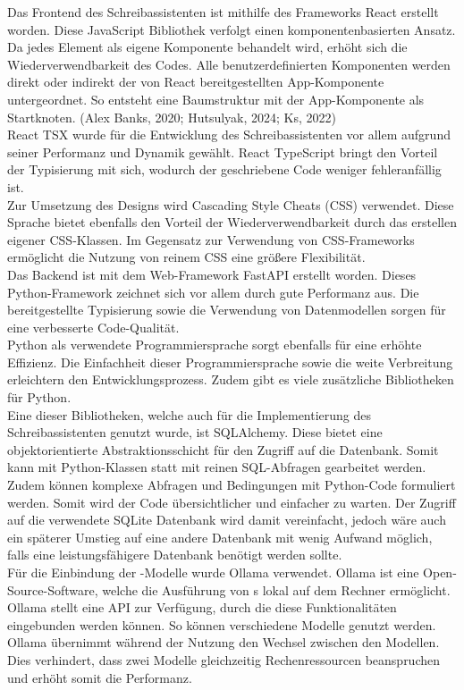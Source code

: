 \documentclass[../main.tex]{subfiles}
\begin{document}
Das Frontend des Schreibassistenten ist mithilfe des Frameworks React erstellt worden. Diese JavaScript Bibliothek verfolgt einen komponentenbasierten Ansatz. Da jedes Element als 
eigene Komponente behandelt wird, erhöht sich die Wiederverwendbarkeit des Codes. Alle benutzerdefinierten Komponenten werden direkt oder indirekt der von React bereitgestellten 
App-Komponente untergeordnet. So entsteht eine Baumstruktur mit der App-Komponente als Startknoten. (Alex Banks, 2020; Hutsulyak, 2024; Ks, 2022)\\
React TSX wurde für die Entwicklung des Schreibassistenten vor allem aufgrund seiner Performanz und Dynamik gewählt. React TypeScript bringt den Vorteil der Typisierung mit sich, 
wodurch der geschriebene Code weniger fehleranfällig ist.\cite{react1,react2} \\
Zur Umsetzung des Designs wird Cascading Style Cheats (CSS) verwendet. Diese Sprache bietet ebenfalls den Vorteil der Wiederverwendbarkeit durch das erstellen eigener CSS-Klassen. 
Im Gegensatz zur Verwendung von CSS-Frameworks ermöglicht die Nutzung von reinem CSS eine größere Flexibilität. \\ 
Das Backend ist mit dem Web-Framework FastAPI erstellt worden. Dieses Python-Framework zeichnet sich vor allem durch gute Performanz aus. Die bereitgestellte Typisierung sowie die 
Verwendung von Datenmodellen sorgen für eine verbesserte Code-Qualität\cite{fastapi}.\\ Python als verwendete Programmiersprache sorgt ebenfalls für eine erhöhte Effizienz. Die Einfachheit dieser 
Programmiersprache sowie die weite Verbreitung erleichtern den Entwicklungsprozess. Zudem gibt es viele zusätzliche Bibliotheken für Python.\cite{python}\\
Eine dieser Bibliotheken, welche auch für die Implementierung des Schreibassistenten genutzt wurde, ist SQLAlchemy. Diese bietet eine objektorientierte Abstraktionsschicht für den 
Zugriff auf die Datenbank. Somit kann mit Python-Klassen statt mit reinen SQL-Abfragen gearbeitet werden. Zudem können komplexe Abfragen und Bedingungen mit Python-Code formuliert 
werden. Somit wird der Code übersichtlicher und einfacher zu warten. Der Zugriff auf die verwendete SQLite Datenbank wird damit vereinfacht, jedoch wäre auch ein späterer Umstieg auf 
eine andere Datenbank mit wenig Aufwand möglich, falls eine leistungsfähigere Datenbank benötigt werden sollte.\cite{SQLAlchemy}\\
Für die Einbindung der -Modelle wurde Ollama verwendet. Ollama ist eine Open-Source-Software, welche die Ausführung von s lokal auf dem Rechner ermöglicht. Ollama stellt eine 
API zur Verfügung, durch die diese Funktionalitäten eingebunden werden können. So können verschiedene Modelle genutzt werden. Ollama übernimmt während der Nutzung den Wechsel 
zwischen den Modellen. Dies verhindert, dass zwei Modelle gleichzeitig Rechenressourcen beanspruchen und erhöht somit die Performanz.\cite{ollamaSchreibassi,ollamaTechnologie}
\end{document}
